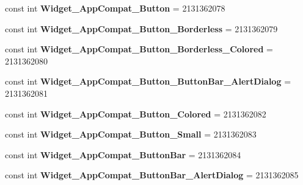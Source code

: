 \begin{DoxyCompactItemize}
const int {\bfseries Widget\+\_\+\+App\+Compat\+\_\+\+Button} = 2131362078
\item 
\mbox{\label{class_pinned_app_1_1_droid_1_1_resource_1_1_style_a0c0ce03e2760a8a94b467a0c71c168c9}} 
const int {\bfseries Widget\+\_\+\+App\+Compat\+\_\+\+Button\+\_\+\+Borderless} = 2131362079
\item 
\mbox{\label{class_pinned_app_1_1_droid_1_1_resource_1_1_style_a33ad8d7cd4ba22d6e7b0ac80b241c20a}} 
const int {\bfseries Widget\+\_\+\+App\+Compat\+\_\+\+Button\+\_\+\+Borderless\+\_\+\+Colored} = 2131362080
\item 
\mbox{\label{class_pinned_app_1_1_droid_1_1_resource_1_1_style_a1879532ab91654c2bc45fe76f6bdf551}} 
const int {\bfseries Widget\+\_\+\+App\+Compat\+\_\+\+Button\+\_\+\+Button\+Bar\+\_\+\+Alert\+Dialog} = 2131362081
\item 
\mbox{\label{class_pinned_app_1_1_droid_1_1_resource_1_1_style_a3fe6851f4d64955f9a08608502c12cce}} 
const int {\bfseries Widget\+\_\+\+App\+Compat\+\_\+\+Button\+\_\+\+Colored} = 2131362082
\item 
\mbox{\label{class_pinned_app_1_1_droid_1_1_resource_1_1_style_a947fdf87e9b4713c8c4949bc3f532611}} 
const int {\bfseries Widget\+\_\+\+App\+Compat\+\_\+\+Button\+\_\+\+Small} = 2131362083
\item 
\mbox{\label{class_pinned_app_1_1_droid_1_1_resource_1_1_style_aa929e8fc605a331efc103992c0785bed}} 
const int {\bfseries Widget\+\_\+\+App\+Compat\+\_\+\+Button\+Bar} = 2131362084
\item 
\mbox{\label{class_pinned_app_1_1_droid_1_1_resource_1_1_style_ac02d41185fcaaf860186e00d0fdf6439}} 
const int {\bfseries Widget\+\_\+\+App\+Compat\+\_\+\+Button\+Bar\+\_\+\+Alert\+Dialog} = 2131362085
\item 
\mbox{\label{class_pinned_app_1_1_droid_1_1_resource_1_1_style_a60eda2a1c0c7722dfd1057a374989e76}} 

\end{DoxyCompactItemize}
